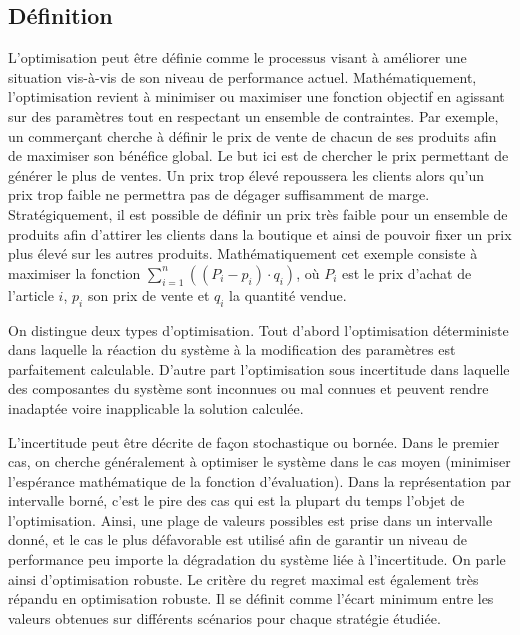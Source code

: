 \label{sec:incertitude}


\subsection{Définition}
L'optimisation peut être définie comme le processus visant à améliorer une situation vis-à-vis de son niveau de performance actuel. Mathématiquement, l'optimisation revient à minimiser ou maximiser une fonction objectif en agissant sur des paramètres tout en respectant un ensemble de contraintes. Par exemple, un commerçant cherche à définir le prix de vente de chacun de ses produits afin de maximiser son bénéfice global. Le but ici est de chercher le prix permettant de générer le plus de ventes. Un prix trop élevé repoussera les clients alors qu'un prix trop faible ne permettra pas de dégager suffisamment de marge. Stratégiquement, il est possible de définir un prix très faible pour un ensemble de produits afin d'attirer les clients dans la boutique et ainsi de pouvoir fixer un prix plus élevé sur les autres produits. Mathématiquement cet exemple consiste à maximiser la fonction $\sum \limits_{i=1}^n \left( (P_i-p_i)\cdot q_i \right)$, où $P_i$ est le prix d'achat de l'article $i$, $p_i$ son prix de vente et 
$q_i$ la quantité vendue.

On distingue deux types d'optimisation. Tout d'abord l'optimisation déterministe dans laquelle la réaction du système à la modification des paramètres est parfaitement calculable. D'autre part l'optimisation sous incertitude dans laquelle des composantes du système sont inconnues ou mal connues et peuvent rendre inadaptée voire inapplicable la solution calculée.

L'incertitude peut être décrite de façon stochastique ou bornée. Dans le premier cas, on cherche généralement à optimiser le système dans le cas moyen (minimiser l'espérance mathématique de la fonction d'évaluation). Dans la représentation par intervalle borné, c'est le pire des cas qui est la plupart du temps l'objet de l'optimisation. Ainsi, une plage de valeurs possibles est prise dans un intervalle donné, et le cas le plus défavorable est utilisé afin de garantir un niveau de performance peu importe la dégradation du système liée à l'incertitude. On parle ainsi d'optimisation robuste. Le critère du regret maximal est également très répandu en optimisation robuste. Il se définit comme l'écart minimum entre les valeurs obtenues sur différents scénarios pour chaque stratégie étudiée.  %

